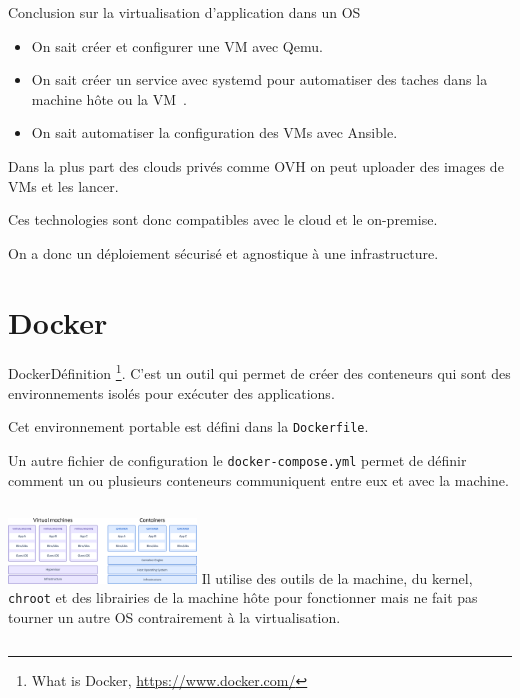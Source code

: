 \documentclass{beamer}
\begin{document}
    \begin{frame}{Conclusion sur la virtualisation d'application dans un OS}
        \begin{itemize}
            \item On sait créer et configurer une VM avec Qemu.
            \item On sait créer un service avec systemd pour automatiser des taches dans la machine hôte ou la VM~.
            \item On sait automatiser la configuration des VMs avec Ansible.
        \end{itemize}
        \bigbreak
        Dans la plus part des clouds privés comme OVH on peut uploader des images de VMs et les lancer.

        Ces technologies sont donc compatibles avec le cloud et le on-premise.

        On a donc un déploiement sécurisé et agnostique à une infrastructure.
    \end{frame}


    \section{Docker}\label{sec:docker}

    \begin{frame}{Docker}{Définition}
        \footnote{What is Docker, \url{https://www.docker.com/}}.
        \bigbreak
        C'est un outil qui permet de créer des conteneurs qui sont des environnements isolés pour exécuter des applications.

        Cet environnement portable est défini dans la \lstinline{Dockerfile}.

        Un autre fichier de configuration le \lstinline{docker-compose.yml} permet de définir comment un ou plusieurs conteneurs communiquent entre eux et avec la machine.
        \bigbreak
        \begin{columns}
            \centering
            \includegraphics[width=5cm]{image/docker-vs-vm}\footnotemark
            Il utilise des outils de la machine, du kernel, \lstinline{chroot} et des librairies de la machine hôte pour fonctionner mais ne fait pas tourner un autre OS contrairement à la virtualisation.
        \end{columns}
    \end{frame}
\end{document}
